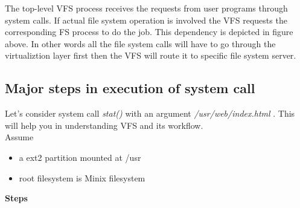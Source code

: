 The top-level VFS process receives the requests from user programs through system calls. If actual file system operation is involved the VFS requests the corresponding FS process to do the job. This dependency is depicted in figure above. In other words all the file system calls will have to go through the virtualiztion layer first then the VFS will route it to specific file system server.

\subsection{Major steps in execution of system call}

Let's consider system call {\em stat()} with an argument {\em /usr/web/index.html} . This will help you in understanding VFS and its workflow.\\

Assume
\begin{itemize}
\item a ext2 partition mounted at /usr
\item root filesystem is Minix filesystem
\end{itemize}

\textbf{Steps}

